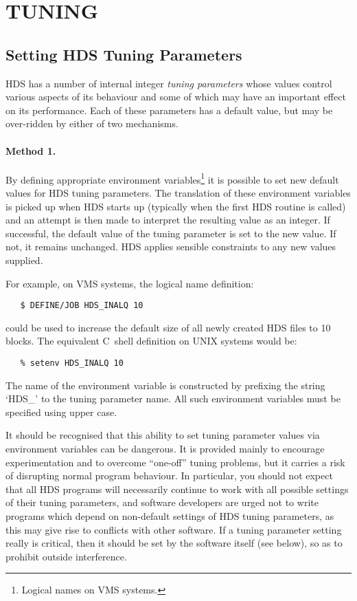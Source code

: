 \section{TUNING}
\label{sect:tuning}

\subsection{Setting HDS Tuning Parameters}
HDS has a number of internal integer {\em tuning parameters} whose values
control various aspects of its behaviour and some of which may have an important
effect on its performance. Each of these parameters has a default value, but may
be over-ridden by either of two mechanisms.

\paragraph{Method 1.} By defining appropriate environment
variables\footnote{Logical names on VMS systems.} it is possible to set new
default values for HDS tuning parameters. The translation of these environment
variables is picked up when HDS starts up (typically when the first HDS routine
is called) and an attempt is then made to interpret the resulting value as an
integer. If successful, the default value of the tuning parameter is set to the
new value. If not, it remains unchanged. HDS applies sensible constraints to any
new values supplied.

For example, on VMS systems, the logical name definition:

\small
\begin{verbatim}
   $ DEFINE/JOB HDS_INALQ 10
\end{verbatim}
\normalsize

could be used to increase the default size of all newly created HDS files to 10
blocks. The equivalent C~shell definition on UNIX systems would be:

\small
\begin{verbatim}
   % setenv HDS_INALQ 10
\end{verbatim}
\normalsize

The name of the environment variable is constructed by prefixing the string
`HDS\_' to the tuning parameter name. All such environment variables must be
specified using upper case.

It should be recognised that this ability to set tuning parameter values via
environment variables can be dangerous. It is provided mainly to encourage
experimentation and to overcome ``one-off'' tuning problems, but it carries a
risk of disrupting normal program behaviour. In particular, you should not
expect that all HDS programs will necessarily continue to work with all possible
settings of their tuning parameters, and software developers are urged not to
write programs which depend on non-default settings of HDS tuning parameters, as
this may give rise to conflicts with other software. If a tuning parameter
setting really is critical, then it should be set by the software itself (see
below), so as to prohibit outside interference.

